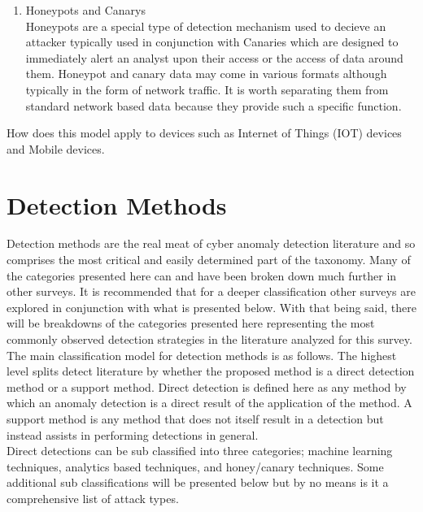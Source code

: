 \documentclass[10pt]{IEEEtran}
\begin{document}
\begin{enumerate}
\begin{enumerate}
            \item Honeypots and Canarys\cite{jasek2013apt}
            \\Honeypots are a special type of detection mechanism used to decieve an attacker typically used in conjunction with Canaries which are designed to immediately alert an analyst upon their access or the access of data around them. Honeypot and canary data may come in various formats although typically in the form of network traffic. It is worth separating them from standard network based data because they provide such a specific function. 
        \end{enumerate}
    How does this model apply to devices such as Internet of Things (IOT) devices and Mobile devices.
\end{enumerate}

\section{Detection Methods}
Detection methods are the real meat of cyber anomaly detection literature and so comprises the most critical and easily determined part of the taxonomy. Many of the categories presented here can and have been broken down much further in other surveys. It is recommended that for a deeper classification other surveys are explored in conjunction with what is presented below. With that being said, there will be breakdowns of the categories presented here representing the most commonly observed detection strategies in the literature analyzed for this survey.\\
The main classification model for detection methods is as follows. The highest level splits detect literature by whether the proposed method is a direct detection method or a support method. Direct detection is defined here as any method by which an anomaly detection is a direct result of the application of the method. A support method is any method that does not itself result in a detection but instead assists in performing detections in general.\\ 
Direct detections can be sub classified into three categories; machine learning techniques, analytics based techniques, and honey/canary techniques. Some additional sub classifications will be presented below but by no means is it a comprehensive list of attack types. \\
\end{document}
